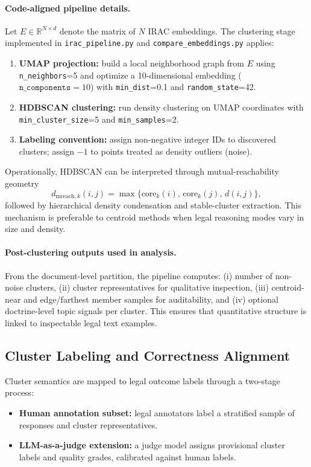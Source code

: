 \documentclass[11pt]{article}
\begin{document}
\paragraph{Code-aligned pipeline details.}
Let $E\in\mathbb{R}^{N\times d}$ denote the matrix of $N$ IRAC embeddings. The clustering stage implemented in \texttt{irac\_pipeline.py} and \texttt{compare\_embeddings.py} applies:
\begin{enumerate}[leftmargin=1.5em]
    \item \textbf{UMAP projection:} build a local neighborhood graph from $E$ using \texttt{n\_neighbors}=5 and optimize a 10-dimensional embedding ($\texttt{n\_components}=10$) with \texttt{min\_dist}=0.1 and \texttt{random\_state}=42.
    \item \textbf{HDBSCAN clustering:} run density clustering on UMAP coordinates with \texttt{min\_cluster\_size}=5 and \texttt{min\_samples}=2.
    \item \textbf{Labeling convention:} assign non-negative integer IDs to discovered clusters; assign $-1$ to points treated as density outliers (noise).
\end{enumerate}

Operationally, HDBSCAN can be interpreted through mutual-reachability geometry
\[
d_{\mathrm{mreach},k}(i,j)=\max\{\mathrm{core}_k(i),\,\mathrm{core}_k(j),\,d(i,j)\},
\]
followed by hierarchical density condensation and stable-cluster extraction. This mechanism is preferable to centroid methods when legal reasoning modes vary in size and density.

\paragraph{Post-clustering outputs used in analysis.}
From the document-level partition, the pipeline computes: (i) number of non-noise clusters, (ii) cluster representatives for qualitative inspection, (iii) centroid-near and edge/farthest member samples for auditability, and (iv) optional doctrine-level topic signals per cluster. This ensures that quantitative structure is linked to inspectable legal text examples.

\subsection{Cluster Labeling and Correctness Alignment}
Cluster semantics are mapped to legal outcome labels through a two-stage process:
\begin{itemize}[leftmargin=1.5em]
    \item \textbf{Human annotation subset:} legal annotators label a stratified sample of responses and cluster representatives.
    \item \textbf{LLM-as-a-judge extension:} a judge model assigns provisional cluster labels and quality grades, calibrated against human labels.
\end{itemize}
\end{document}
